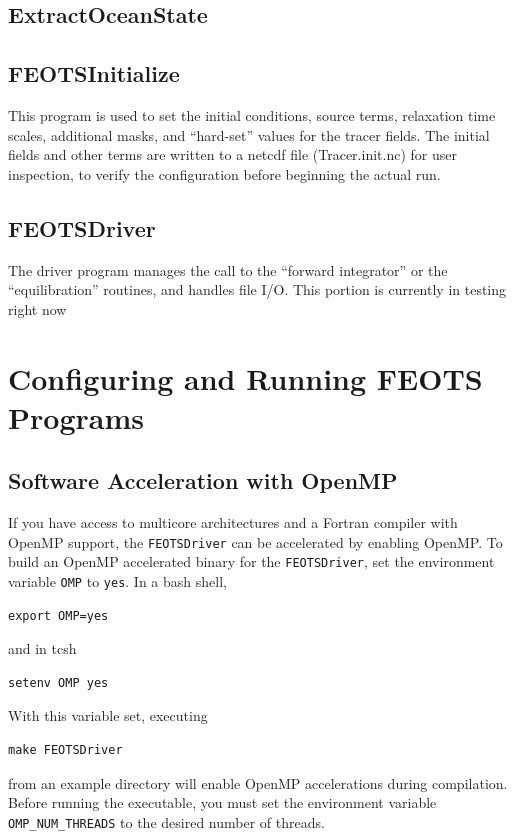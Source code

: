 \documentclass{softwaremanual}
\begin{document}
\section{ExtractOceanState}

\section{FEOTSInitialize}
This program is used to set the initial conditions, source terms, relaxation time scales, additional masks, and “hard-set” values for the tracer fields. The initial fields and other terms are written to a netcdf file (Tracer.init.nc) for user inspection, to verify the configuration before beginning the actual run.

\section{FEOTSDriver}
The driver program manages the call to the “forward integrator” or the “equilibration” routines, and handles file I/O. This portion is currently in testing right now

\chapter{Configuring and Running FEOTS Programs}

\section{Software Acceleration with OpenMP}
If you have access to multicore architectures and a Fortran compiler with OpenMP support, the \texttt{FEOTSDriver} can be accelerated by enabling OpenMP. To build an OpenMP accelerated binary for the \texttt{FEOTSDriver}, set the environment variable \texttt{OMP} to \texttt{yes}. In a bash shell,
\begin{verbatim}
export OMP=yes
\end{verbatim} 
and in tcsh
\begin{verbatim}
setenv OMP yes
\end{verbatim}
With this variable set, executing
\begin{verbatim}
make FEOTSDriver
\end{verbatim}
from an example directory will enable OpenMP accelerations during compilation. Before running the executable, you must set the environment variable \texttt{OMP\_NUM\_THREADS} to the desired number of threads.\\
\end{document}
